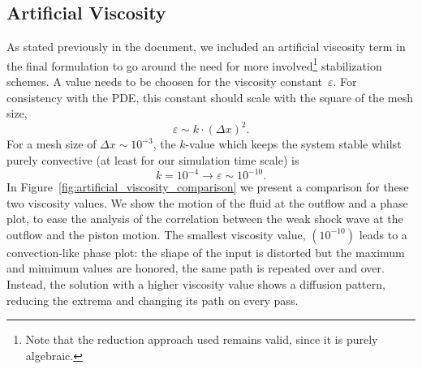 \documentclass[../../thesis.tex]{subfiles}
\begin{document}
\subsection{Artificial Viscosity}
\label{sec:fom_calibration_artificial_viscosity}
As stated previously in the document, 
we included an artificial viscosity term in the final formulation
to go around the need for more involved\footnote{
    Note that the reduction approach used remains valid,
    since it is purely algebraic.} 
stabilization schemes.
A value needs to be choosen for the viscosity constant~$\varepsilon$.
For consistency with the PDE, 
this constant should scale with the square of the mesh size, 
\begin{equation*}
    \varepsilon \sim k \cdot (\Delta x)^2.
\end{equation*}
For a mesh size of $\Delta x \sim 10^{-3}$,
the $k$-value which keeps the system stable whilst purely convective 
(at least for our simulation time scale) is
\begin{equation*}
    k = 10^{-4} \rightarrow \varepsilon \sim 10^{-10}.
\end{equation*}
In Figure~\ref{fig:artificial_viscosity_comparison} we present a comparison for these two viscosity values.
We show the motion of the fluid at the outflow and a phase plot, to ease the analysis of the correlation between the weak shock wave at the outflow and the piston motion.
The smallest viscosity value, $(10^{-10})$ leads to a \mbox{convection-like} phase plot:
the shape of the input is distorted but the maximum and mimimum values are honored, 
the same path is repeated over and over.
Instead, the solution with a higher viscosity value shows a diffusion pattern, 
reducing the extrema and changing its path on every pass.
\end{document}
